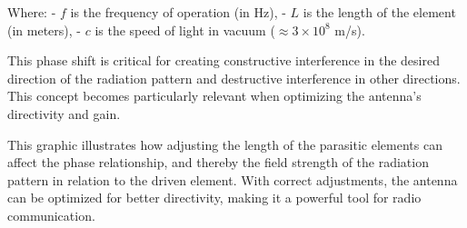 Where:
- \( f \) is the frequency of operation (in Hz),
- \( L \) is the length of the element (in meters),
- \( c \) is the speed of light in vacuum (\( \approx 3 \times 10^8 \) m/s).

This phase shift is critical for creating constructive interference in the desired direction of the radiation pattern and destructive interference in other directions. This concept becomes particularly relevant when optimizing the antenna's directivity and gain.


This graphic illustrates how adjusting the length of the parasitic elements can affect the phase relationship, and thereby the field strength of the radiation pattern in relation to the driven element. With correct adjustments, the antenna can be optimized for better directivity, making it a powerful tool for radio communication.
